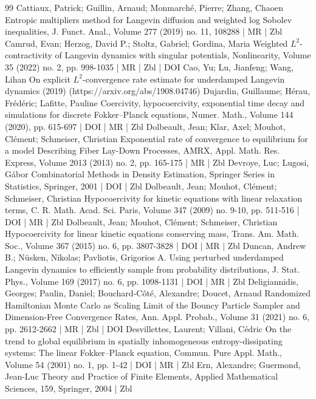 \documentclass[10pt]{amsart}
\theoremstyle{definition}\newtheorem{defi}[theo]{Definition}\newtheorem{rema}[theo]{Remark}\newtheorem{exam}[theo]{Example}\newtheorem{exem}[theo]{Example}\newtheorem{nota}[theo]{Notation}
\begin{document}
\begin{thebibliography}{99}
Cattiaux, Patrick; Guillin, Arnaud; Monmarché, Pierre; Zhang, Chaoen Entropic multipliers method for Langevin diffusion and weighted log Sobolev inequalities, J. Funct. Anal., Volume 277 (2019) no. 11, 108288 | MR | Zbl
Camrud, Evan; Herzog, David P.; Stoltz, Gabriel; Gordina, Maria Weighted ${L}^2$-contractivity of Langevin dynamics with singular potentials, Nonlinearity, Volume 35 (2022) no. 2, pp. 998-1035 | MR | Zbl | DOI
Cao, Yu; Lu, Jianfeng; Wang, Lihan On explicit ${L}^2$-convergence rate estimate for underdamped Langevin dynamics (2019) (https://arxiv.org/abs/1908.04746)
Dujardin, Guillaume; Hérau, Frédéric; Lafitte, Pauline Coercivity, hypocoercivity, exponential time decay and simulations for discrete Fokker–Planck equations, Numer. Math., Volume 144 (2020), pp. 615-697 | DOI | MR | Zbl
Dolbeault, Jean; Klar, Axel; Mouhot, Clément; Schmeiser, Christian Exponential rate of convergence to equilibrium for a model Describing Fiber Lay-Down Processes, AMRX, Appl. Math. Res. Express, Volume 2013 (2013) no. 2, pp. 165-175 | MR | Zbl
Devroye, Luc; Lugosi, Gábor Combinatorial Methods in Density Estimation, Springer Series in Statistics, Springer, 2001 | DOI | Zbl
Dolbeault, Jean; Mouhot, Clément; Schmeiser, Christian Hypocoercivity for kinetic equations with linear relaxation terms, C. R. Math. Acad. Sci. Paris, Volume 347 (2009) no. 9-10, pp. 511-516 | DOI | MR | Zbl
Dolbeault, Jean; Mouhot, Clément; Schmeiser, Christian Hypocoercivity for linear kinetic equations conserving mass, Trans. Am. Math. Soc., Volume 367 (2015) no. 6, pp. 3807-3828 | DOI | MR | Zbl
Duncan, Andrew B.; Nüsken, Nikolas; Pavliotis, Grigorios A. Using perturbed underdamped Langevin dynamics to efficiently sample from probability distributions, J. Stat. Phys., Volume 169 (2017) no. 6, pp. 1098-1131 | DOI | MR | Zbl
Deligiannidis, Georges; Paulin, Daniel; Bouchard-Côté, Alexandre; Doucet, Arnaud Randomized Hamiltonian Monte Carlo as Scaling Limit of the Bouncy Particle Sampler and Dimension-Free Convergence Rates, Ann. Appl. Probab., Volume 31 (2021) no. 6, pp. 2612-2662 | MR | Zbl | DOI
Desvillettes, Laurent; Villani, Cédric On the trend to global equilibrium in spatially inhomogeneous entropy-dissipating systems: The linear Fokker–Planck equation, Commun. Pure Appl. Math., Volume 54 (2001) no. 1, pp. 1-42 | DOI | MR | Zbl
Ern, Alexandre; Guermond, Jean-Luc Theory and Practice of Finite Elements, Applied Mathematical Sciences, 159, Springer, 2004 | Zbl

\end{thebibliography}
\end{document}
